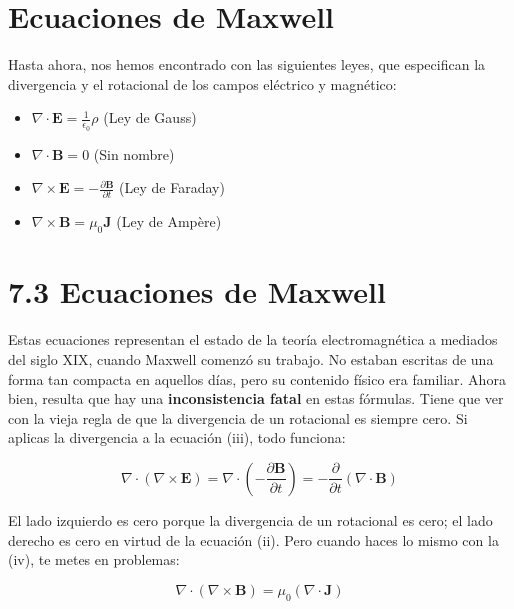 \documentclass[12pt,a4paper]{report}
\begin{document}
	\section{Ecuaciones de Maxwell}
	
	\noindent Hasta ahora, nos hemos encontrado con las siguientes leyes, que especifican la divergencia y el rotacional de los campos eléctrico y magnético:
	
	\begin{itemize}
		\item[(i)] $\nabla \cdot \mathbf{E} = \frac{1}{\epsilon_0}\rho$ \hfill (Ley de Gauss)
		\item[(ii)] $\nabla \cdot \mathbf{B} = 0$ \hfill (Sin nombre)
		\item[(iii)] $\nabla \times \mathbf{E} = -\frac{\partial \mathbf{B}}{\partial t}$ \hfill (Ley de Faraday)
		\item[(iv)] $\nabla \times \mathbf{B} = \mu_0 \mathbf{J}$ \hfill (Ley de Ampère)
	\end{itemize}
	
	\vspace{0.5cm}
	\section*{7.3 Ecuaciones de Maxwell}
	
	Estas ecuaciones representan el estado de la teoría electromagnética a mediados del siglo XIX, cuando Maxwell comenzó su trabajo. No estaban escritas de una forma tan compacta en aquellos días, pero su contenido físico era familiar. Ahora bien, resulta que hay una \textbf{inconsistencia fatal} en estas fórmulas. Tiene que ver con la vieja regla de que la divergencia de un rotacional es siempre cero. Si aplicas la divergencia a la ecuación (iii), todo funciona:
	
	\begin{equation*}
		\nabla \cdot (\nabla \times \mathbf{E}) = \nabla \cdot \left( -\frac{\partial \mathbf{B}}{\partial t} \right) = -\frac{\partial}{\partial t} (\nabla \cdot \mathbf{B})
	\end{equation*}
	
	\noindent El lado izquierdo es cero porque la divergencia de un rotacional es cero; el lado derecho es cero en virtud de la ecuación (ii). Pero cuando haces lo mismo con la (iv), te metes en problemas:
	
	\begin{equation}
		\nabla \cdot (\nabla \times \mathbf{B}) = \mu_0 (\nabla \cdot \mathbf{J}) \tag{7.36}
	\end{equation}
	
\end{document}
